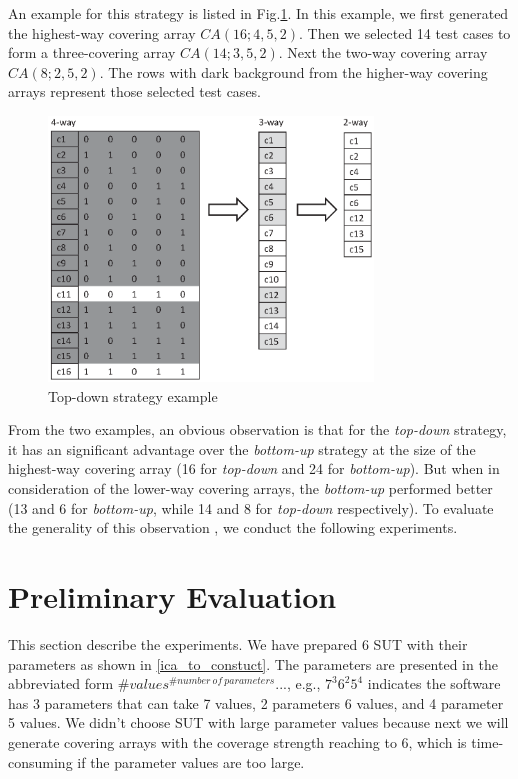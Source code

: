 \documentclass[conference]{IEEEtran}
\theoremstyle{definition}
\begin{document}
An example for this strategy is listed in Fig.\ref{decrease-example}. In this example, we first generated the highest-way covering array $CA(16; 4, 5, 2)$. Then we selected 14 test cases to form a three-covering array $CA(14; 3, 5, 2)$. Next the two-way covering array $CA(8; 2, 5, 2)$. The rows with dark background from the higher-way covering arrays represent those selected test cases.

\begin{figure}
 \includegraphics[width=3.4in]{decrease_example.eps}
\caption{Top-down strategy example}
\label{decrease-example}
\end{figure}


From the two examples, an obvious observation is that for the \emph{top-down} strategy, it has an significant advantage over the \emph{bottom-up} strategy at the size of the highest-way covering array (16 for \emph{top-down} and 24 for \emph{bottom-up}). But when in consideration of the lower-way covering arrays, the \emph{bottom-up} performed better (13 and 6 for \emph{bottom-up}, while 14 and 8 for \emph{top-down} respectively).  To evaluate the generality of this observation , we conduct the following experiments.




\section{Preliminary Evaluation}
This section describe the experiments. We have prepared 6 SUT with their parameters as shown in \ref{ica_to_constuct}. The parameters are  presented in the abbreviated form $\#values^{\#number\ of\ parameters} ...$, e.g., $7^{3}6^{2}5^{4}$ indicates the software has 3 parameters that can take 7 values, 2 parameters 6 values, and 4 parameter 5 values. We didn't choose SUT with large parameter values because next we will generate covering arrays with the coverage strength reaching to 6, which is time-consuming if the parameter values are too large.
\end{document}
